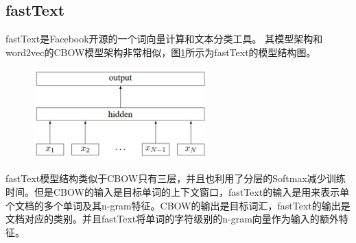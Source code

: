 \subsection{fastText}
fastText\cite{joulin2016bag}是Facebook开源的一个词向量计算和文本分类工具。
其模型架构和word2vec\cite{mikolov2013distributed}的CBOW模型架构非常相似，图\ref{fig:fasttext}所示为fastText的模型结构图。
\begin{figure}[htb]
    \centering
    \includegraphics[width=0.6\textwidth]{Img/fastText.png}
    \label{fig:fasttext}
\end{figure}
fastText模型结构类似于CBOW只有三层，并且也利用了分层的Softmax减少训练时间。但是CBOW的输入是目标单词的上下文窗口，fastText的输入是用来表示单个文档的多个单词及其n-gram特征。CBOW的输出是目标词汇，fastText的输出是文档对应的类别。并且fastText将单词的字符级别的n-gram向量作为输入的额外特征。

